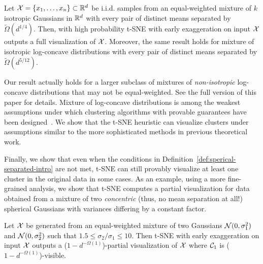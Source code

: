 \begin{cor}[Informal]
 Let $\mathcal{X} = \{x_1, \ldots, x_n\}\subset \mathbb{R}^d$ be  i.i.d. samples 
 from an equal-weighted mixture of $k$ isotropic Gaussians in $\mathbb{R}^d$ with every pair of distinct means separated by $\tilde{\Omega}( d^{1/4} )$. %
 Then, with high probability %
 t-SNE with early exaggeration on input $\mathcal{X}$ outputs a full visualization of $\mathcal{X}$. Moreover, the same result holds for mixture of isotropic log-concave distributions with every pair of distinct means separated by $\tilde \Omega( d^{5/12} )$.%
\end{cor}
\begin{remark*}
Our result actually holds for a larger subclass of mixtures of \emph{non-isotropic} log-concave distributions that may not be equal-weighted. See the full version of this paper for details.
Mixture of log-concave distributions is among the weakest assumptions under which clustering algorithms with provable guarantees have been designed~\citep{arora2005learning,vempala2004spectral}. We show that the t-SNE heuristic can visualize clusters under assumptions similar to the more sophisticated methods in previous theoretical work.
\end{remark*}

Finally, we show that even when the conditions in Definition~\ref{def:sperical-separated-intro} are not met, t-SNE can still provably visualize at least one cluster in the original data in some cases. As an example, using a more fine-grained analysis, we show that t-SNE computes a partial visualization for data obtained from a mixture of two \emph{concentric} (thus, no mean separation at all!) spherical Gaussians with variances differing by a constant factor. %


\begin{thm}[Informal] \label{thm:partial-vis-2gaussian-intro}
	Let $\mathcal{X}$ be generated from an equal-weighted mixture of two Gaussians $\mathcal{N}(0, \sigma_1^2)$ and $\mathcal{N}(0, \sigma_2^2)$ such that $1.5 \le \sigma_2/\sigma_1 \le 10$.
	Then t-SNE with early exaggeration on input $\mathcal{X}$ outputs a ($1-d^{-\Omega(1)}$)-partial visualization of $\mathcal{X}$ where $\mathcal{C}_1$ is ($1-d^{-\Omega(1)}$)-visible.
\end{thm}









